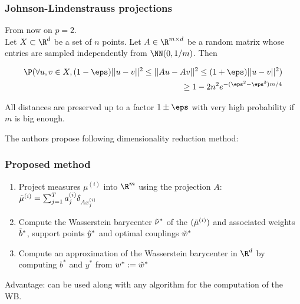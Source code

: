 \documentclass{beamer}
\begin{document}
\begin{frame}
\frametitle{Johnson-Lindenstrauss projections}

From now on $p = 2$. \\
Let $X \subset \R^d$ be a set of $n$ points.
Let $A \in \R^{m \times d}$ be a random matrix whose entries are sampled independently from $\NN(0, 1/m)$. Then

\begin{align*}
    \P(\forall u, v \in X, (1 - \eps) ||u - v||^2 \leq ||Au - Av||^2 \leq (1 + \eps) ||u - v||^2 ) &\\
    \geq 1 - 2n^2e^{-(\eps^2-\eps^3)m / 4} &
\end{align*}

All distances are preserved up to a factor $1 \pm \eps$ with very high probability if $m$ is big enough. \cite{kakade_random_2009}
\end{frame}

\begin{frame}
The authors propose following dimensionality reduction method:
\frametitle{Proposed method}
\begin{enumerate}
    \item Project measures $\mu^{(i)}$ into $\R^m$ using the projection $A$: $\Tilde{\mu}^{(i)} = \sum_{j=1}^T a^{(i)}_j \delta_{Ax^{(i)}_j}$
    \item Compute the Wasserstein barycenter $\Tilde{\nu}^*$ of the $(\Tilde{\mu}^{(i)})$ and associated weights $\Tilde{b}^*$, support points $\Tilde{y}^*$ and optimal couplings $\Tilde{w}^*$
    \item Compute an approximation of the Wasserstein barycenter in $\R^d$ by computing $b^*$ and $y^*$ from $w^* := \Tilde{w}^*$
\end{enumerate}
Advantage: can be used along with any algorithm for the computation of the WB.
\end{frame}
\end{document}
